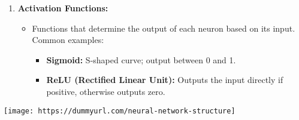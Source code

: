 \documentclass[aspectratio=169]{beamer}
\begin{document}
\begin{frame}[fragile]
\begin{enumerate}
        \item \textbf{Activation Functions:}
            \begin{itemize}
                \item Functions that determine the output of each neuron based on its input. Common examples: 
                    \begin{itemize}
                        \item \textbf{Sigmoid:} S-shaped curve; output between 0 and 1.
                        \item \textbf{ReLU (Rectified Linear Unit):} Outputs the input directly if positive, otherwise outputs zero.
                    \end{itemize}
            \end{itemize}
    \end{enumerate}

    \texttt{[image: https://dummyurl.com/neural-network-structure]}
\end{frame}
\end{document}
